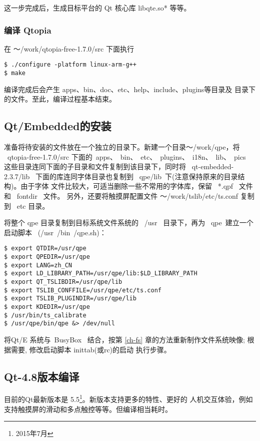 	这一步完成后，生成目标平台的 Qt 核心库 libqte.so* 等等。

\subsubsection{编译 Qtopia}
	在 ～/work/qtopia-free-1.7.0/src 下面执行

\begin{boxedminipage}{.9\textwidth}
\begin{verbatim} 
$ ./configure -platform linux-arm-g++
$ make
\end{verbatim}
\end{boxedminipage}

	编译完成后会产生 apps、bin、doc、etc、help、include、plugins等目录及
目录下的文件。至此，编译过程基本结束。

\subsection{Qt/Embedded的安装}
	准备将待安装的文件放在一个独立的目录下。新建一个目录～/work/qpe，将
~qtopia-free-1.7.0/src 下面的~apps、~bin、~etc、~plugins、~i18n、~lib、~pics~
这些目录连同下面的子目录和文件复制到该目录下，同时将 ~qt-embedded-2.3.7/lib~
下面的库连同字体目录也复制到 ~qpe/lib~下(注意保持原来的目录结构)。由于字体
文件比较大，可适当删除一些不常用的字体库，保留 ~*.qpf~ 文件和 ~fontdir~ 文件。
另外，还要将触摸屏配置文件 ～/work/tslib/etc/ts.conf 复制到 ~etc 目录。

	将整个 qpe 目录复制到目标系统文件系统的 ~/usr~ 目录下，再为 ~qpe~建立一个
启动脚本 ~(/usr~/bin~/qpe.sh)：

\begin{boxedminipage}{.9\textwidth}
\begin{verbatim} 
$ export QTDIR=/usr/qpe
$ export QPEDIR=/usr/qpe
$ export LANG=zh_CN
$ export LD_LIBRARY_PATH=/usr/qpe/lib:$LD_LIBRARY_PATH
$ export QT_TSLIBDIR=/usr/qpe/lib
$ export TSLIB_CONFFILE=/usr/qpe/etc/ts.conf
$ export TSLIB_PLUGINDIR=/usr/qpe/lib
$ export KDEDIR=/usr/qpe
$ /usr/bin/ts_calibrate
$ /usr/qpe/bin/qpe &> /dev/null
\end{verbatim}
\end{boxedminipage}

	将Qt/E 系统与~BusyBox~ 结合，按第{} \ref{ch-fs}
章的方法重新制作文件系统映像; 根据需要, 修改启动脚本 inittab(或rc)的启动
执行步骤。

\subsection{Qt-4.8版本编译}
目前的Qt最新版本是 5.5\footnote{2015年7月}。新版本支持更多的特性、更好的
人机交互体验，例如支持触摸屏的滑动和多点触控等等。但编译相当耗时。

